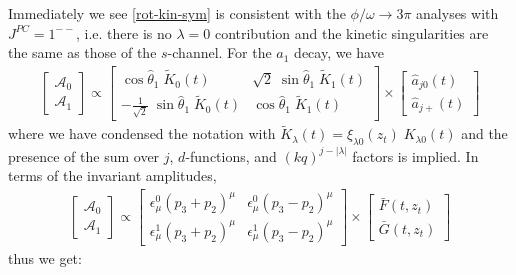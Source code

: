 \documentclass[10pt, aps,prd,amsmath,amssymb,superscriptaddress,onecolumn,
nofootinbib,showpacs,preprintnumbers]{revtex4-1}
\begin{document}
Immediately we see \cref{rot-kin-sym} is consistent with the \(\phi/\omega \to 3\pi\) analyses \cite{Danilkin:2014cra,Niecknig:2012sj} with \(J^{PC} = 1^{--}\), i.e. there is no \(\lambda = 0\) contribution and the kinetic singularities are the same as those of the \(s\)-channel. For the \(a_1\) decay, we have
  \begin{align}
    \begin{bmatrix}
    \mathcal{A}_0 \\
    \mathcal{A}_1
    \end{bmatrix}
    \propto
    \begin{bmatrix}
        \cos \hat{\theta}_1 \; \tilde{K}_{0}(t) &  \sqrt{2} \; \sin \hat{\theta}_1 \; \tilde{K}_{1}(t)  \\
       - \frac{1}{\sqrt{2}}  \; \sin \hat{\theta}_1 \; \tilde{K}_{0}(t) & \cos \hat{\theta}_1 \;  \tilde{K}_{1}(t)
    \end{bmatrix}
    \times
    \begin{bmatrix}
      \hat{a}_{j0}(t) \\
       \hat{a}_{j+}(t)
    \end{bmatrix}
  \end{align}
where we have condensed the notation with \(\tilde{K}_\lambda(t) = \xi_{\lambda0}(z_t) \; K_{\lambda0}(t)\) and the presence of the sum over \(j\), \(d\)-functions, and \((kq)^{j-|\lambda|}\) factors is implied. In terms of the invariant amplitudes,
  \begin{align}
    \begin{bmatrix}
    \mathcal{A}_0 \\
    \mathcal{A}_1
    \end{bmatrix}
    \propto
    \begin{bmatrix}
      \epsilon_\mu^0 (p_3 + p_2)^\mu & \epsilon_\mu^0 (p_3 - p_2)^\mu \\
    \epsilon_\mu^1  (p_3 + p_2)^\mu & \epsilon_\mu^1 (p_3 - p_2)^\mu
    \end{bmatrix}
    \times
    \begin{bmatrix}
      \bar{F}(t,z_t) \\
       \bar{G}(t,z_t)
    \end{bmatrix}
  \end{align}
thus we get:
\end{document}
